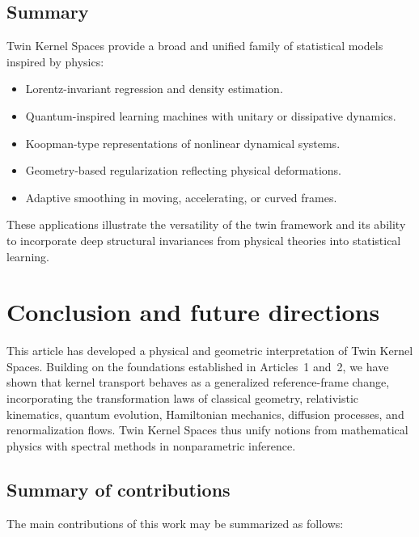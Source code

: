 \documentclass[11pt]{article}
\theoremstyle{definition}
\begin{document}
\subsection{Summary}

Twin Kernel Spaces provide a broad and unified family of statistical models inspired by physics:
\begin{itemize}[itemsep=3pt]
	\item Lorentz-invariant regression and density estimation.
	\item Quantum-inspired learning machines with unitary or dissipative dynamics.
	\item Koopman-type representations of nonlinear dynamical systems.
	\item Geometry-based regularization reflecting physical deformations.
	\item Adaptive smoothing in moving, accelerating, or curved frames.
\end{itemize}

These applications illustrate the versatility of the twin framework and its ability to incorporate deep structural invariances from physical theories into statistical learning.

	
\section{Conclusion and future directions}
\label{sec:conclusion}

This article has developed a physical and geometric interpretation of Twin Kernel Spaces.
Building on the foundations established in Articles~1 and~2, we have shown that kernel transport behaves as a generalized reference-frame change, incorporating the transformation laws of classical geometry, relativistic kinematics, quantum evolution, Hamiltonian mechanics, diffusion processes, and renormalization flows.
Twin Kernel Spaces thus unify notions from mathematical physics with spectral methods in nonparametric inference.

\subsection*{Summary of contributions}

The main contributions of this work may be summarized as follows:
\end{document}
